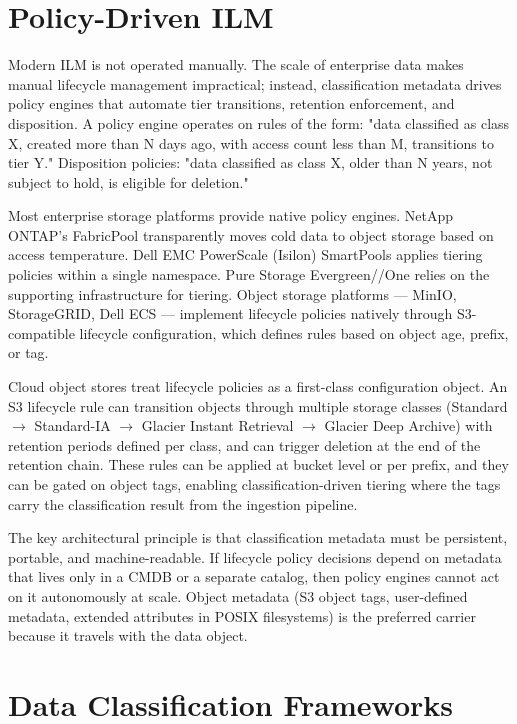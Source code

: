 \section{Policy-Driven ILM}
Modern ILM is not operated manually. The scale of enterprise data makes manual lifecycle management impractical; instead, classification metadata drives policy engines that automate tier transitions, retention enforcement, and disposition. A policy engine operates on rules of the form: "data classified as class X, created more than N days ago, with access count less than M, transitions to tier Y." Disposition policies: "data classified as class X, older than N years, not subject to hold, is eligible for deletion."

Most enterprise storage platforms provide native policy engines. NetApp ONTAP's FabricPool transparently moves cold data to object storage based on access temperature. Dell EMC PowerScale (Isilon) SmartPools applies tiering policies within a single namespace. Pure Storage Evergreen//One relies on the supporting infrastructure for tiering. Object storage platforms --- MinIO, StorageGRID, Dell ECS --- implement lifecycle policies natively through S3-compatible lifecycle configuration, which defines rules based on object age, prefix, or tag.

Cloud object stores treat lifecycle policies as a first-class configuration object. An S3 lifecycle rule can transition objects through multiple storage classes (Standard $\rightarrow$ Standard-IA $\rightarrow$ Glacier Instant Retrieval $\rightarrow$ Glacier Deep Archive) with retention periods defined per class, and can trigger deletion at the end of the retention chain. These rules can be applied at bucket level or per prefix, and they can be gated on object tags, enabling classification-driven tiering where the tags carry the classification result from the ingestion pipeline.

The key architectural principle is that classification metadata must be persistent, portable, and machine-readable. If lifecycle policy decisions depend on metadata that lives only in a CMDB or a separate catalog, then policy engines cannot act on it autonomously at scale. Object metadata (S3 object tags, user-defined metadata, extended attributes in POSIX filesystems) is the preferred carrier because it travels with the data object.

\section{Data Classification Frameworks}
